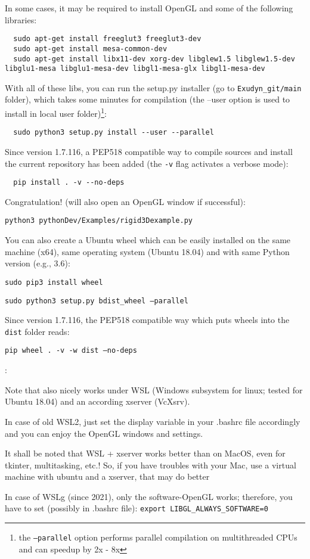 In some cases, it may be required to install OpenGL and some of the following libraries:
\begin{lstlisting}
  sudo apt-get install freeglut3 freeglut3-dev
  sudo apt-get install mesa-common-dev
  sudo apt-get install libx11-dev xorg-dev libglew1.5 libglew1.5-dev libglu1-mesa libglu1-mesa-dev libgl1-mesa-glx libgl1-mesa-dev
\end{lstlisting}

\noindent 
With all of these libs, you can run the setup.py installer (go to \texttt{Exudyn\_git/main} folder), which takes some minutes for compilation (the --user option is used to install in local user folder)\footnote{the \texttt{--parallel} option performs parallel compilation on multithreaded CPUs and can speedup by 2x - 8x}:
\begin{lstlisting}
  sudo python3 setup.py install --user --parallel
\end{lstlisting}
Since version 1.7.116, a PEP518 compatible way to compile sources and install the current repository has been added (the \texttt{-v} flag activates a verbose mode):
\begin{lstlisting}
  pip install . -v --no-deps
\end{lstlisting}

\noindent 
Congratulation!  (will also open an OpenGL window if successful):
\bi
  \item[] \texttt{python3 pythonDev/Examples/rigid3Dexample.py}
\ei

\noindent You can also create a Ubuntu wheel which can be easily installed on the same machine (x64), same operating system (Ubuntu 18.04) and with same Python version (e.g., 3.6):
\bi
  \item[] \texttt{sudo pip3 install wheel}
  \item[] \texttt{sudo python3 setup.py bdist\_wheel --parallel}
\ei

\noindent Since version 1.7.116, the PEP518 compatible way which puts wheels into the \texttt{dist} folder reads:
\bi
  \item[] \texttt{pip wheel . -v -w dist --no-deps}
\ei


\noindent {}:
\bi
  \item Note that \codeName also nicely works under WSL (Windows subsystem for linux; tested for Ubuntu 18.04) and an according xserver (VcXsrv).
  \item In case of old WSL2, just set the display variable in your .bashrc file accordingly and you can enjoy the OpenGL windows and settings.
  \item It shall be noted that WSL + xserver works better than on MacOS, even for tkinter, multitasking, etc.! So, if you have troubles with your Mac, use a virtual machine with ubuntu and a xserver, that may do better
  \item In case of WSLg (since 2021), only the software-OpenGL works; therefore, you have to set (possibly in .bashrc file): \texttt{export LIBGL\_ALWAYS\_SOFTWARE=0}
\ei

